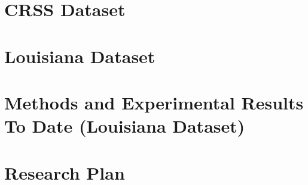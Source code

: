 \documentclass[11pt, twopage, openright]{book}
\begin{document}
\begin{spacing}{1.2}
\newpage
\chapter{CRSS Dataset}
\localtableofcontents\newpage









\newpage
\chapter{Louisiana Dataset}
\localtableofcontents\newpage



\newpage
\chapter{Methods and Experimental Results To Date (Louisiana Dataset)}
\localtableofcontents\newpage






\newpage
\chapter{Research Plan}
\label{sec:Research_Plan}
\localtableofcontents\newpage





\newpage
{}
{}
\printbibliography

\end{spacing}
\end{document}
